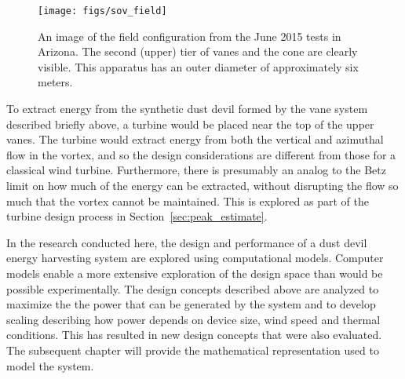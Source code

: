   \begin{figure}[!htb]
    \begin{center}
     \texttt{[image: figs/sov\_field]}
     \caption{An image of the field configuration from the June 2015
     tests in Arizona. The second (upper) tier of vanes and the cone are
     clearly visible. This apparatus has an outer diameter of
     approximately six meters.}
     \label{fig:field_test}
    \end{center}
  \end{figure}

To extract energy from the synthetic dust devil formed by the vane
system described briefly above, a turbine would be placed near the top
of the upper vanes. The turbine would extract energy from both the
vertical and azimuthal flow in the vortex, and so the design
considerations are different from those for a classical wind turbine.
Furthermore, there is presumably an analog to the Betz limit on how
much of the energy can be extracted, without disrupting the flow so
much that the vortex cannot be maintained. This is explored as part of
the turbine design process in Section~\ref{sec:peak_estimate}. 

In the research conducted here, the design and performance of a dust
devil energy harvesting system are explored using computational
models. Computer models enable a more extensive exploration of
the design space than would be possible experimentally. The design
concepts described above are analyzed to maximize the the
power that can be generated by the system and to develop scaling
describing how power depends on device size, wind speed and thermal
conditions. This has resulted in new design concepts that were also 
evaluated. The subsequent chapter will provide the mathematical
representation used to model the system.  

%
%
%


